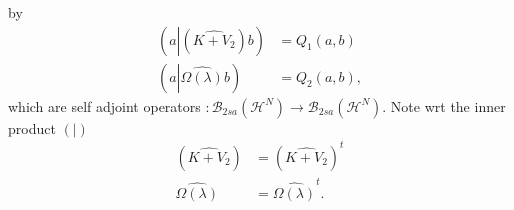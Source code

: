 \documentclass[aps,preprint]{revtex4}%
\begin{document}
by
\begin{align}
\left(  a\left\vert \left(  \widehat{K+V_{2}}\right)  \right.  b\right)   &
=Q_{1}\left(  a,b\right)  \nonumber\\
\left(  a\left\vert \widehat{\Omega\left(  \lambda\right)  }\right.  b\right)
&  =Q_{2}\left(  a,b\right)  ,
\end{align}
which are self adjoint operators $:\mathcal{B}_{2sa}\left(  \mathcal{H}%
^{N}\right)  \rightarrow\mathcal{B}_{2sa}\left(  \mathcal{H}^{N}\right)  .$
Note wrt the inner product $\left(  |\right)  $
\begin{align}
\left(  \widehat{K+V_{2}}\right)   &  =\left(  \widehat{K+V_{2}}\right)
^{t}\\
\widehat{\Omega\left(  \lambda\right)  } &  =\widehat{\Omega\left(
\lambda\right)  }^{t}.
\end{align}
\end{document}
